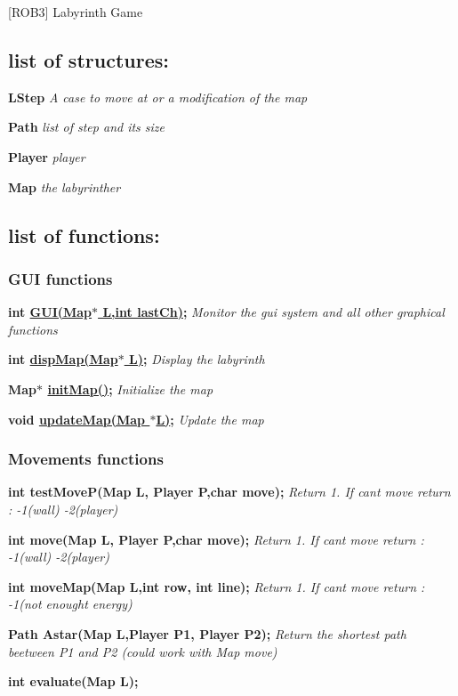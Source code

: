 \mbox{[}R\+O\+B3\mbox{]} Labyrinth Game

\subsection*{list of structures\+:}

{\bfseries L\+Step} {\itshape A case to move at or a modification of the map}

{\bfseries Path} {\itshape list of step and its size}

{\bfseries Player} {\itshape player}

{\bfseries Map} {\itshape the labyrinther}

\subsection*{list of functions\+:}

\subsubsection*{G\+UI functions}

{\bfseries int \hyperlink{gui_8h_aadf45496327e577d13cb7135e578dc73}{G\+U\+I(\+Map$\ast$ L,int last\+Ch)};} {\itshape Monitor the gui system and all other graphical functions}

{\bfseries int \hyperlink{gui_8h_a82e2bf7357d16998055a8768e3632f0e}{disp\+Map(\+Map$\ast$ L)};} {\itshape Display the labyrinth}

{\bfseries Map$\ast$ \hyperlink{mapping_8c_af7560ce2af2a08abe0b230e7ba56cf45}{init\+Map()};} {\itshape Initialize the map}

{\bfseries void \hyperlink{mapping_8h_acf87be0f8a95fdb44dce3da0707aac0f}{update\+Map(\+Map $\ast$\+L)};} {\itshape Update the map} \subsubsection*{Movements functions}

{\bfseries int test\+Move\+P(\+Map L, Player P,char move);} {\itshape Return 1. If can\textquotesingle{}t move return \+: -\/1(wall) -\/2(player)}

{\bfseries int move(\+Map L, Player P,char move);} {\itshape Return 1. If can\textquotesingle{}t move return \+: -\/1(wall) -\/2(player)}

{\bfseries int move\+Map(\+Map L,int row, int line);} {\itshape Return 1. If can\textquotesingle{}t move return \+: -\/1(not enought energy)}

{\bfseries Path Astar(\+Map L,\+Player P1, Player P2);} {\itshape Return the shortest path beetween P1 and P2 (could work with Map move)}

{\bfseries int evaluate(\+Map L);} 